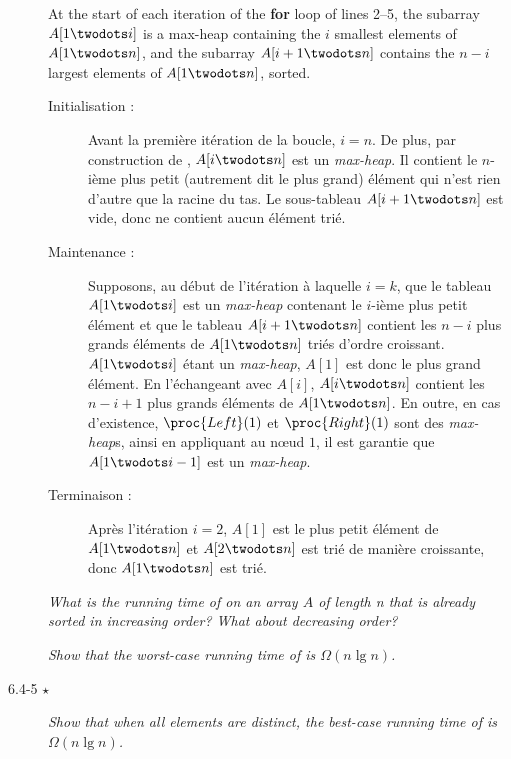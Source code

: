 \begin{description}
{  At the start of each iteration of the \textbf{for} loop of lines 2–5, the subarray
$A[1 \twodots i]$ is a max-heap containing the $i$ smallest elements of $A[1 \twodots n]$, and
the subarray $A[i+1 \twodots n]$ contains the $n-i$ largest elements of $A[1 \twodots n]$,
sorted.}
    \begin{ex}
      \begin{description}
        \item[Initialisation :] Avant la premi\`ere it\'eration de la boucle, $i=n$. De plus, par construction de , $A[i\twodots n]$ est un \textit{max-heap}. Il contient le $n$-i\`eme plus petit (autrement dit le plus grand) \'el\'ement qui n'est rien d'autre que la racine du tas. Le sous-tableau $A[i+1\twodots n]$ est vide, donc ne contient aucun \'el\'ement tri\'e.
        \item[Maintenance :] Supposons, au d\'ebut de l'it\'eration \`a laquelle $i=k$, que le tableau $A[1\twodots i]$ est un \textit{max-heap} contenant le $i$-i\`eme plus petit \'el\'ement et que le tableau $A[i+1\twodots n]$ contient les $n-i$ plus grands \'el\'ements de $A[1\twodots n]$ tri\'es d'ordre croissant. $A[1\twodots i]$ \'etant un \textit{max-heap}, $A[1]$ est donc le plus grand \'el\'ement. En l'\'echangeant avec $A[i]$, $A[i\twodots n]$ contient les $n-i+1$ plus grands \'el\'ements de $A[1\twodots n]$. En outre, en cas d'existence, $\proc{Left}(1)$ et $\proc{Right}(1)$ sont des \textit{max-heap}s, ainsi en appliquant  au n\oe ud $1$, il est garantie que $A[1\twodots i-1]$ est un \textit{max-heap}. 
        \item[Terminaison :] Apr\`es l'it\'eration $i=2$, $A[1]$ est le plus petit \'el\'ement de $A[1\twodots n]$ et $A[2\twodots n]$ est tri\'e de mani\`ere croissante, donc $A[1 \twodots n]$ est tri\'e.
      \end{description}
    \end{ex}
 \textit{What is the running time of  on an array $A$ of length n that is already
sorted in increasing order? What about decreasing order?}
    \begin{exrev}
      
    \end{exrev}
 \textit{Show that the worst-case running time of  is $\Omega (n \lg n)$.}
    \begin{exrev}
      
    \end{exrev}
  \item[6.4-5 $\star$]  \textit{Show that when all elements are distinct, the best-case running time of 
is $\Omega(n \lg n)$.}
    \begin{exrev}
      
    \end{exrev}
\end{description}

